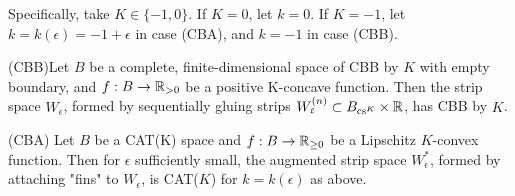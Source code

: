 




Specifically,  take $K\in \{-1,0\}$.  If $K = 0$, let $ k = 0$.  If $ K =  -  1$, let $k = k(\epsilon) = -1+\epsilon$ in case  (CBA), and $k=-1$ in case (CBB).

(CBB)Let $B$ be a complete, finite-dimensional space of CBB by $K$
with empty boundary, and $f : B \to \R_{ > 0}$ be a positive K-concave 
function.
Then the strip space $W_\epsilon$, formed by sequentially gluing strips $W_\epsilon^{(n)} \subset  {B_{\cs{K}}} \times \R$,
has CBB by $K$.

(CBA) Let $B$ be a CAT(K) space  and  $f : B \to \R_{\ge 0}$
be a Lipschitz 
$K$-convex function. Then for $\epsilon$ sufficiently small, the augmented strip
space $W^*_\epsilon$, formed by attaching "fins" to $W_\epsilon$, is CAT($K$) for $k = k(\epsilon)$ as
above.

